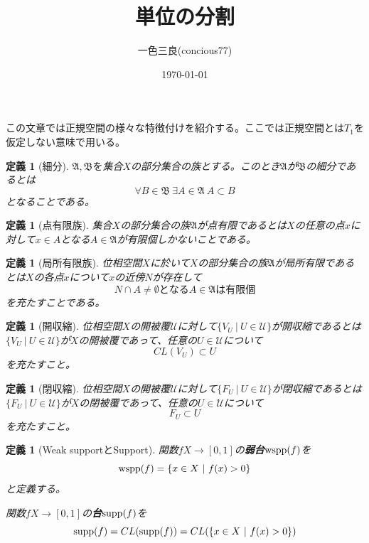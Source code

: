 \documentclass[leqno]{jsarticle}
\title{単位の分割}
\author{一色三良(concious77)}
\date{\today}
\newtheorem{df}[thm]{定義}
\newcommand{\supp}{\text{{\rm supp}}}
\newcommand{\wspp}{\text{{\rm wspp}}}
\begin{document}
\maketitle
この文章では正規空間の様々な特徴付けを紹介する。ここでは正規空間とは$T_1$を仮定しない意味で用いる。

\begin{df}[細分]$\mathfrak{A},\mathfrak{B}を$集合$X$の部分集合の族とする。このとき$\mathfrak{A}$が$\mathfrak{B}$の細分であるとは
\[
\forall B\in \mathfrak{B}\ \exists A\in \mathfrak{A}\ A\subset B
\]
となることである。
\end{df}

\begin{df}[点有限族]集合$X$の部分集合の族$\mathfrak{A}$が点有限であるとは$X$の任意の点$x$に対して$x\in A$となる$A\in \mathfrak{A}$が有限個しかないことである。

\end{df}

\begin{df}[局所有限族]位相空間$X$に於いて$X$の部分集合の族$\mathfrak{A}$が局所有限であるとは$X$の各点$x$について$x$の近傍$N$が存在して
\[
N\cap A\neq \emptyset となるA\in \mathfrak{A}は有限個
\]
を充たすことである。
\end{df}

\begin{df}[開収縮]位相空間$X$の開被覆$\mathcal{U}$に対して$\{V_U\ |\ U\in \mathcal{U}\}$が開収縮であるとは$\{V_U\ |\ U\in \mathcal{U}\}$が$X$の開被覆であって、任意の$U\in \mathcal{U}$について
\[
CL(V_U)\subset U
\]
を充たすこと。
\end{df}

\begin{df}[閉収縮]位相空間$X$の開被覆$\mathcal{U}$に対して$\{F_U\ |\ U\in \mathcal{U}\}$が閉収縮であるとは$\{F_U\ |\ U\in \mathcal{U}\}$が$X$の閉被覆であって、任意の$U\in \mathcal{U}$について
\[
F_{U}\subset U
\]
を充たすこと。
\end{df}


\begin{df}[Weak supportとSupport]
関数$fX\to [0,1]$の{\bf 弱台}$\wspp (f)$を
\[
\wspp (f)=\{x\in X\ |\ f(x)>0\}
\]
と定義する。\par
関数$fX\to [0,1]$の{\bf 台}$\supp (f)$を
\[
\supp (f)=CL(\supp(f))=CL(\{x\in X\ |\ f(x)>0\})
\]

\end{df}
\end{document}
